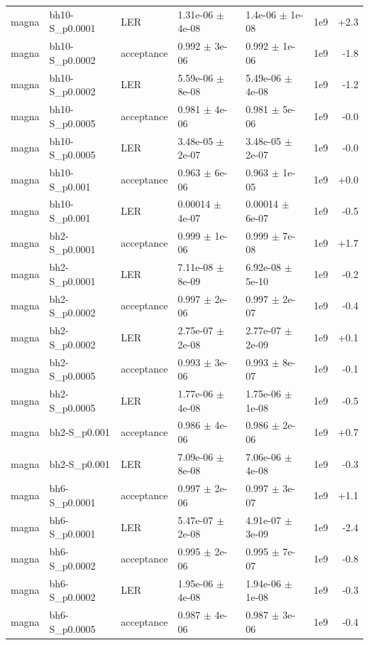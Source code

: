 \documentclass[10pt]{article}
\begin{document}
{\begin{longtable}{l l l l l r r}
magna & bh10-S\_p0.0001 & LER & 1.31e-06 $\pm$ 4e-08 & 1.4e-06 $\pm$ 1e-08 & 1e9 & +2.3 \\
magna & bh10-S\_p0.0002 & acceptance & 0.992 $\pm$ 3e-06 & 0.992 $\pm$ 1e-06 & 1e9 & -1.8 \\
magna & bh10-S\_p0.0002 & LER & 5.59e-06 $\pm$ 8e-08 & 5.49e-06 $\pm$ 4e-08 & 1e9 & -1.2 \\
magna & bh10-S\_p0.0005 & acceptance & 0.981 $\pm$ 4e-06 & 0.981 $\pm$ 5e-06 & 1e9 & -0.0 \\
magna & bh10-S\_p0.0005 & LER & 3.48e-05 $\pm$ 2e-07 & 3.48e-05 $\pm$ 2e-07 & 1e9 & -0.0 \\
magna & bh10-S\_p0.001 & acceptance & 0.963 $\pm$ 6e-06 & 0.963 $\pm$ 1e-05 & 1e9 & +0.0 \\
magna & bh10-S\_p0.001 & LER & 0.00014 $\pm$ 4e-07 & 0.00014 $\pm$ 6e-07 & 1e9 & -0.5 \\
magna & bh2-S\_p0.0001 & acceptance & 0.999 $\pm$ 1e-06 & 0.999 $\pm$ 7e-08 & 1e9 & +1.7 \\
magna & bh2-S\_p0.0001 & LER & 7.11e-08 $\pm$ 8e-09 & 6.92e-08 $\pm$ 5e-10 & 1e9 & -0.2 \\
magna & bh2-S\_p0.0002 & acceptance & 0.997 $\pm$ 2e-06 & 0.997 $\pm$ 2e-07 & 1e9 & -0.4 \\
magna & bh2-S\_p0.0002 & LER & 2.75e-07 $\pm$ 2e-08 & 2.77e-07 $\pm$ 2e-09 & 1e9 & +0.1 \\
magna & bh2-S\_p0.0005 & acceptance & 0.993 $\pm$ 3e-06 & 0.993 $\pm$ 8e-07 & 1e9 & -0.1 \\
magna & bh2-S\_p0.0005 & LER & 1.77e-06 $\pm$ 4e-08 & 1.75e-06 $\pm$ 1e-08 & 1e9 & -0.5 \\
magna & bh2-S\_p0.001 & acceptance & 0.986 $\pm$ 4e-06 & 0.986 $\pm$ 2e-06 & 1e9 & +0.7 \\
magna & bh2-S\_p0.001 & LER & 7.09e-06 $\pm$ 8e-08 & 7.06e-06 $\pm$ 4e-08 & 1e9 & -0.3 \\
magna & bh6-S\_p0.0001 & acceptance & 0.997 $\pm$ 2e-06 & 0.997 $\pm$ 3e-07 & 1e9 & +1.1 \\
magna & bh6-S\_p0.0001 & LER & 5.47e-07 $\pm$ 2e-08 & 4.91e-07 $\pm$ 3e-09 & 1e9 & -2.4 \\
magna & bh6-S\_p0.0002 & acceptance & 0.995 $\pm$ 2e-06 & 0.995 $\pm$ 7e-07 & 1e9 & -0.8 \\
magna & bh6-S\_p0.0002 & LER & 1.95e-06 $\pm$ 4e-08 & 1.94e-06 $\pm$ 1e-08 & 1e9 & -0.3 \\
magna & bh6-S\_p0.0005 & acceptance & 0.987 $\pm$ 4e-06 & 0.987 $\pm$ 3e-06 & 1e9 & -0.4 \\

\end{longtable}}
\end{document}
